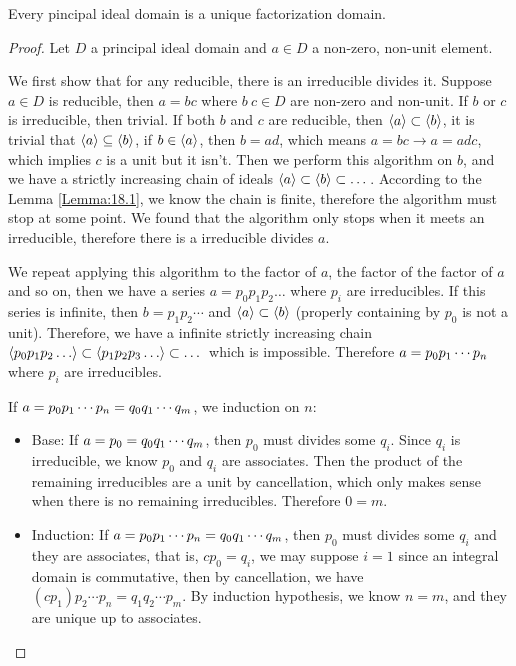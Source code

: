 \documentclass[../main.tex]{subfiles}
\begin{document}
\begin{theorem}
  Every pincipal ideal domain is a unique factorization domain.
\end{theorem}
\begin{proof}
  Let $D$ a principal ideal domain and $a \in D$ a non-zero, non-unit element.

  We first show that for any reducible, there is an irreducible divides it.
  Suppose $a \in D$ is reducible, then $a = bc$ where $b \ c \in D$ are 
  non-zero and non-unit. If $b$ or $c$ is irreducible, then trivial.
  If both $b$ and $c$ are reducible, then $\cyc{a} \subset \cyc{b}$,
  it is trivial that $\cyc{a} \subseteq \cyc{b}$, if $b \in \cyc{a}$, then
  $b = ad$, which means $a = bc \rightarrow a = adc$, which implies $c$ is a unit
  but it isn't. Then we perform this algorithm on $b$, and we have a strictly
  increasing chain of ideals $\cyc{a} \subset \cyc{b} \subset \dots$.
  According to the Lemma \ref{Lemma:18.1}, we know the chain is finite,
  therefore the algorithm must stop at some point.
  We found that the algorithm only stops when it meets an irreducible,
  therefore there is a irreducible divides $a$.

  We repeat applying this algorithm to the factor of $a$,
  the factor of the factor of $a$ and so on, then we have a series $a = p_0 p_1 p_2 \dots$
  where $p_i$ are irreducibles. If this series is infinite,
  then $b = p_1 p_2 \cdots$ and $\cyc{a} \subset \cyc{b}$ (properly containing by $p_0$ is not a unit).
  Therefore, we have a infinite strictly increasing chain $\cyc{p_0 p_1 p_2 \dots} \subset \cyc{p_1 p_2 p_3 \dots} \subset \dots$
  which is impossible. Therefore $a = \join[]{p}{n}$ where $p_i$ are irreducibles.

  If $a = \join[]{p}{n} = \join[]{q}{m}$, we induction on $n$:
  \begin{itemize}
    \item Base: If $a = p_0 = \join[]{q}{m}$, then $p_0$ must divides some $q_i$.
          Since $q_i$ is irreducible, we know $p_0$ and $q_i$ are associates.
          Then the product of the remaining irreducibles are a unit by cancellation,
          which only makes sense when there is no remaining irreducibles.
          Therefore $0 = m$.
    \item Induction: If $a = \join[]{p}{n} = \join[]{q}{m}$, then $p_0$
          must divides some $q_i$ and they are associates, that is, $cp_0 = q_i$, 
          we may suppose $i = 1$ since an integral domain is commutative, 
          then by cancellation,
          we have $(c p_1) p_2 \cdots p_n = q_1 q_2 \cdots p_m$. By induction hypothesis,
          we know $n = m$, and they are unique up to associates.
  \end{itemize}
\end{proof}
\end{document}
